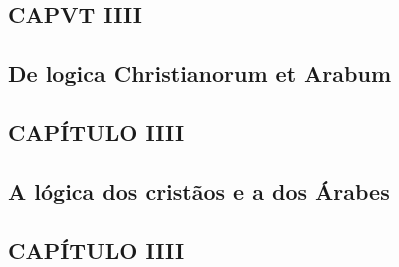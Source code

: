 \documentclass{article}
\begin{document}
\pagebreak
\begin{paracol}{3} %
  \begin{nthcolumn*}{0} %
    \subsection*{\centering CAPVT IIII}
    \subsection*{\centering De logica Christianorum et Arabum} 
  \end{nthcolumn*}
  \vspace{0.5cm}
  \begin{nthcolumn}{1} %
    \subsection*{\centering CAPÍTULO IIII}
    \subsection*{\centering A lógica dos cristãos e a dos Árabes}
  \end{nthcolumn}
  \vspace{0.5cm}
  \begin{nthcolumn}{2} %
    \subsection*{\centering CAPÍTULO IIII}

\end{nthcolumn}
\end{paracol}
\end{document}
